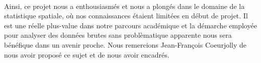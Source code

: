 \documentclass[12pt]{article}
\begin{document}
\\
Ainsi, ce projet nous a enthousiasmés et nous a plongés dans le domaine de la statistique spatiale, où nos connaissances étaient limitées en début de projet. Il est une réelle plus-value dans notre parcours académique et la démarche employée pour analyser des données brutes sans problèmatique apparente nous sera bénéfique dans un avenir proche. Nous remercions Jean-François Coeurjolly de nous avoir proposé ce sujet et de nous avoir encadrés.
\newpage
{}

\printbibliography
\end{document}

